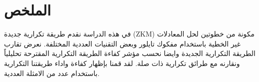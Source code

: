 \chapter*{الملخص}

في هذه الدراسة نقدم طريقة تكرارية جديدة (ZKM) مكونة من خطوتين لحل المعادلات غير الخطية باستخدام مفكوك تايلور وبعض التقنيات العددية المختلفة. نعرض تقارب الطريقة التكرارية الجديدة وايضا نحسب مؤشر كفاءة الطريقة التكرارية المقترحة تحليلياً ونقارنه مع طرائق تكرارية ذات صلة. لقد قمنا بإظهار كفاءة واداء طريقتنا التكرارية باستخدام عدد من الامثلة العددية. 